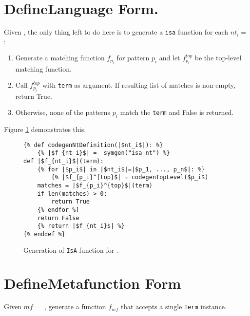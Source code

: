 \section{DefineLanguage Form.}
Given \DefineLanguage, the only thing left to do here is to generate a \texttt{isa} function for each $nt_i=$\NtDefinition:
\begin{enumerate}
\item Generate a matching function $f_{p_i}$ for pattern $p_i$ and let $f_{p_i}^{top}$ be the top-level matching function.
\item Call $f_{p_i}^{top}$ with \texttt{term} as argument. If resulting list of matches is non-empty, return True.
\item Otherwise, none of the patterns $p_i$ match the \texttt{term} and False is returned.
\end{enumerate}

Figure \ref{codegen-ntdef} demonstrates this.

\begin{figure}
\begin{verbatim}
{% def codegenNtDefinition(|$nt_i$|): %}
	{% |$f_{nt_i}$| =  symgen("isa_nt") %}
def |$f_{nt_i}$|(term):
	{% for |$p_i$| in |$nt_i$|=|$p_1, ..., p_n$|: %}
		{% |$f_{p_i}^{top}$| = codegenTopLevel($p_i$)
	matches = |$f_{p_i}^{top}$|(term)
	if len(matches) > 0:
		return True
	{% endfor %]
	return False
	{% return |$f_{nt_i}$| %}
{% enddef %}
\end{verbatim}
\caption{Generation of \texttt{IsA} function for \NtDefinitionNoArgs.}
\label{codegen-ntdef}
\end{figure}

\section{DefineMetafunction Form}

Given $mf=$ \DefineMetafunction, generate a function $f_{mf}$ that accepts a single \texttt{Term} instance.


